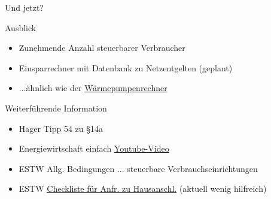 \begin{frame}{Und jetzt?}
   \begin{block}{Ausblick}
      \begin{itemize}
         \item Zunehmende Anzahl steuerbarer Verbraucher
         \item Einsparrechner mit Datenbank zu Netzentgelten (geplant)
         \item ...ähnlich wie der \href{https://waermepumpenrechner.streamlit.app/}{Wärmepumpenrechner}
      \end{itemize}
   \end{block}

   \vspace{0.5cm}
   \begin{block}{Weiterführende Information}
      \begin{itemize}
         \item Hager Tipp 54\cite{HagerTipp54_2024} zu §14a
         \item Energiewirtschaft einfach \href{https://www.youtube.com/watch?v=N_o7TpAXCUA}{Youtube-Video}
         \item ESTW Allg. Bedingungen ... steuerbare Verbrauchseinrichtungen\cite{ESTW2024AllgBedstVEP14a}
         \item ESTW \href{https://netze.estw.de/de/Checkliste-fuer-Anfragen-zu-Hausanschluessen/Checkliste-fuer-Anfragen-zu-Hausanschluessen.html}{Checkliste für Anfr. zu Hausanschl.} (aktuell wenig hilfreich)
      \end{itemize}
   \end{block}
\end{frame}


